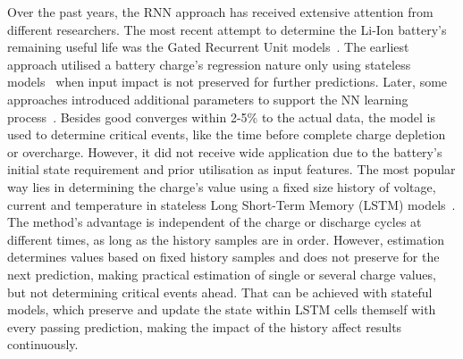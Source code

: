 %
Over the past years, the RNN approach has received extensive attention from different researchers. The most recent attempt to determine the Li-Ion battery's remaining useful life was the Gated Recurrent Unit models~\cite{song_lithium-ion_2018,javid_adaptive_2020,xiao_accurate_2019,jiao_gru-rnn_2020}.
The earliest approach utilised a battery charge's regression nature only using stateless models~\cite{song_lithium-ion_2018,jiao_gru-rnn_2020,xiao_accurate_2019} when input impact is not preserved for further predictions.
Later, some approaches introduced additional parameters to support the NN learning process~\cite{mamo_long_2020,jiao_gru-rnn_2020,javid_adaptive_2020}.
Besides good converges within 2-5\% to the actual data, the model is used to determine critical events, like the time before complete charge depletion or overcharge.
However, it did not receive wide application due to the battery's initial state requirement and prior utilisation as input features.
The most popular way lies in determining the charge's value using a fixed size history of voltage, current and temperature in stateless Long Short-Term Memory (LSTM) models~\cite{Chemali2017,mamo_long_2020,javid_adaptive_2020,zhang_deep_2020}.
The method's advantage is independent of the charge or discharge cycles at different times, as long as the history samples are in order.
However, estimation determines values based on fixed history samples and does not preserve for the next prediction, making practical estimation of single or several charge values, but not determining critical events ahead.
That can be achieved with stateful models, which preserve and update the state within LSTM cells themself with every passing prediction, making the impact of the history affect results continuously.

